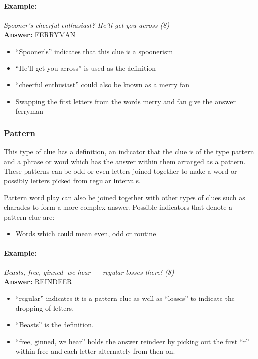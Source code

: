 \paragraph{Example:} \emph{Spooner's cheerful enthusiast? He'll get you across (8)} - \citep{connorSpoon12} \\
\textbf{Answer:} FERRYMAN 

\begin{itemize}
  \item ``Spooner’s'' indicates that this clue is a spoonerism 
  \item ``He’ll get you across'' is used as the definition 
  \item ``cheerful enthusiast'' could also be known as a merry fan 
  \item Swapping the first letters from the words merry and fan give the answer
        ferryman 
\end{itemize}


\subsubsection{Pattern}

This type of clue has a definition, an indicator that the clue is of the type
pattern and a phrase or word which has the answer within them arranged as a
pattern. These patterns can be odd or even letters joined together to make a
word or possibly letters picked from regular intervals.

Pattern word play can also be joined together with other types of clues such as
charades to form a more complex answer. Possible  indicators that denote a
pattern clue are:

\begin{itemize} 
  \item Words which could mean even, odd or routine 
\end{itemize}

\paragraph{Example:} \emph{Beasts, free, ginned, we hear — regular losses there! (8)} - \citep{shuchiPicking09} \\
\textbf{Answer:} REINDEER 

\begin{itemize}
  \item ``regular'' indicates it is a pattern clue as well as ``losses'' to 
        indicate the dropping of letters.
  \item ``Beasts'' is the definition.
  \item ``free, ginned, we hear'' holds the answer reindeer by picking out 
        the first ``r'' within free and each letter alternately from then on.
\end{itemize} 



